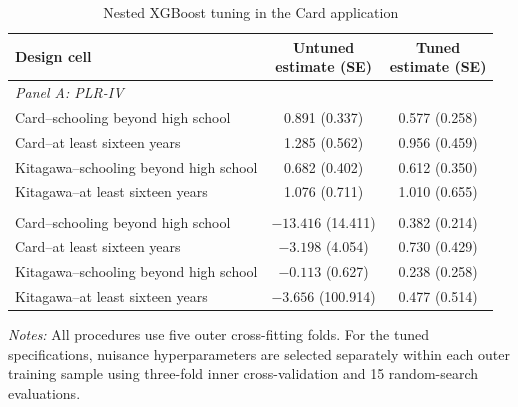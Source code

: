 \documentclass[12pt, a4paper, oneside]{article}
\theoremstyle{plain}
\theoremstyle{definition}
\begin{document}
\begin{table}[H]
\centering
\caption{Nested XGBoost tuning in the Card application}
\label{tab:card_xgb_tuning_appendix}
\scriptsize
\setlength{\tabcolsep}{5pt}
\renewcommand{\arraystretch}{0.98}
\begin{threeparttable}
\begin{tabular}{@{}lcc@{}}
\toprule
Design cell
& \shortstack{Untuned\\estimate (SE)}
& \shortstack{Tuned\\estimate (SE)} \\
\midrule

\multicolumn{3}{l}{\textit{Panel A: PLR-IV}} \\[2pt]

Card--schooling beyond high school
& 0.891 (0.337)
& 0.577 (0.258) \\

Card--at least sixteen years
& 1.285 (0.562)
& 0.956 (0.459) \\

Kitagawa--schooling beyond high school
& 0.682 (0.402)
& 0.612 (0.350) \\

Kitagawa--at least sixteen years
& 1.076 (0.711)
& 1.010 (0.655) \\

\addlinespace[5pt]
\multicolumn{3}{l}{\textit{Panel B: Wald-AIPW}} \\[2pt]

Card--schooling beyond high school
& \(-13.416\) (14.411)
& 0.382 (0.214) \\

Card--at least sixteen years
& \(-3.198\) (4.054)
& 0.730 (0.429) \\

Kitagawa--schooling beyond high school
& \(-0.113\) (0.627)
& 0.238 (0.258) \\

Kitagawa--at least sixteen years
& \(-3.656\) (100.914)
& 0.477 (0.514) \\

\bottomrule
\end{tabular}

\begin{tablenotes}
\footnotesize
\item \textit{Notes:} All procedures use five outer cross-fitting folds.
For the tuned specifications, nuisance hyperparameters are selected separately
within each outer training sample using three-fold inner cross-validation and
15 random-search evaluations. 
\end{tablenotes}
\end{threeparttable}
\end{table}
\end{document}
